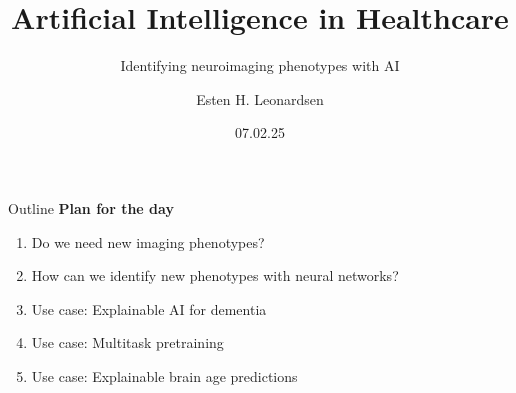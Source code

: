 \documentclass[10pt]{beamer}
\title{Artificial Intelligence in Healthcare}
\subtitle{Identifying neuroimaging phenotypes with AI}
\author{Esten H. Leonardsen}
\date{07.02.25}
\begin{document}
	\begin{frame}
	 	\maketitle
	\end{frame}

    \begin{frame}{Outline}
        \textbf{Plan for the day}
        \begin{enumerate}
            \item Do we need new imaging phenotypes?
            \item How can we identify new phenotypes with neural networks?
            \item Use case: Explainable AI for dementia
            \item Use case: Multitask pretraining
            \item Use case: Explainable brain age predictions
        \end{enumerate}
    \end{frame}

    
    
    
    
    
    
\end{document}
